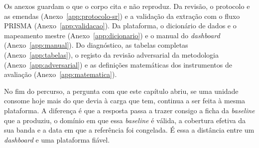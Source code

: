 Os anexos guardam o que o corpo cita e não reproduz. Da revisão, o
protocolo e as emendas (Anexo~\ref{app:protocolo-sr}) e a validação da
extração com o fluxo PRISMA (Anexo~\ref{app:validacao}). Da plataforma,
o dicionário de dados e o mapeamento mestre (Anexo~\ref{app:dicionario})
e o manual do \emph{dashboard} (Anexo~\ref{app:manual}). Do diagnóstico,
as tabelas completas (Anexo~\ref{app:tabelas}), o registo da revisão
adversarial da metodologia (Anexo~\ref{app:adversarial}) e as definições
matemáticas dos instrumentos de avaliação (Anexo~\ref{app:matematica}).

No fim do percurso, a pergunta com que este capítulo abriu, se uma
unidade consome hoje mais do que devia à carga que tem, continua a ser
feita à mesma plataforma. A diferença é que a resposta passa a
trazer consigo a ficha da \emph{baseline} que a produziu, o domínio em
que essa \emph{baseline} é válida, a cobertura efetiva da sua banda e a
data em que a referência foi congelada. É essa a distância entre um
\emph{dashboard} e uma plataforma fiável.
